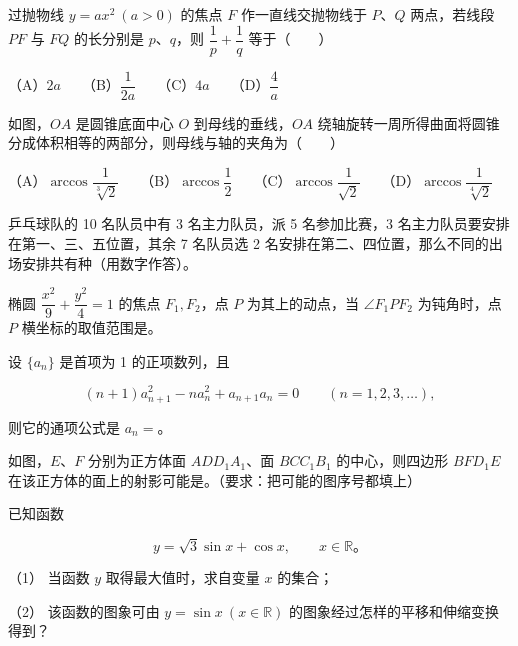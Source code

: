 \begin{question}
过抛物线 $y=ax^2\ (a>0)$ 的焦点 $F$ 作一直线交抛物线于 $P$、$Q$ 两点，若线段 $PF$ 与 $FQ$ 的长分别是 $p$、$q$，则 $\dfrac1p+\dfrac1q$ 等于\mbox{（　　）}

（A）$2a$　　（B）$\dfrac1{2a}$　　（C）$4a$　　（D）$\dfrac4a$

\Needspace{0.4\textheight}
\end{question}
\begin{question}
如图，$OA$ 是圆锥底面中心 $O$ 到母线的垂线，$OA$ 绕轴旋转一周所得曲面将圆锥分成体积相等的两部分，则母线与轴的夹角为\mbox{（　　）}
\nopagebreak[4]
\begin{center}\end{center}
\nopagebreak[4]
（A）$\arccos\dfrac1{\sqrt[3]{2}}$　　（B）$\arccos\dfrac12$　　（C）$\arccos\dfrac1{\sqrt2}$　　（D）$\arccos\dfrac1{\sqrt[4]{2}}$

\end{question}

\begin{question}
乒乓球队的 10 名队员中有 3 名主力队员，派 5 名参加比赛，3 名主力队员要安排在第一、三、五位置，其余 7 名队员选 2 名安排在第二、四位置，那么不同的出场安排共有\gkblank{}种（用数字作答）。

\end{question}
\begin{question}
椭圆 $\dfrac{x^2}{9}+\dfrac{y^2}{4}=1$ 的焦点 $F_1,F_2$，点 $P$ 为其上的动点，当 $\angle F_1PF_2$ 为钝角时，点 $P$ 横坐标的取值范围是\gkblank{}。

\end{question}
\begin{question}
设 $\{a_n\}$ 是首项为 1 的正项数列，且

\nopagebreak[4]
\[
(n+1)a_{n+1}^2-na_n^2+a_{n+1}a_n=0
\qquad(n=1,2,3,\ldots),
\]

则它的通项公式是 $a_n=$\gkblank{}。

\Needspace{0.4\textheight}
\end{question}
\begin{question}
如图，$E$、$F$ 分别为正方体面 $ADD_1A_1$、面 $BCC_1B_1$ 的中心，则四边形 $BFD_1E$ 在该正方体的面上的射影可能是\gkblank{}。（要求：把可能的图序号都填上）
\nopagebreak[4]
\begin{center}\end{center}
\nopagebreak[4]
\end{question}
\begin{question}
已知函数

\nopagebreak[4]
\[
y=\sqrt3\sin x+\cos x,\qquad x\in\mathbb R。
\]

（1） 当函数 $y$ 取得最大值时，求自变量 $x$ 的集合；

（2） 该函数的图象可由 $y=\sin x\ (x\in\mathbb R)$ 的图象经过怎样的平移和伸缩变换得到？

\end{question}

